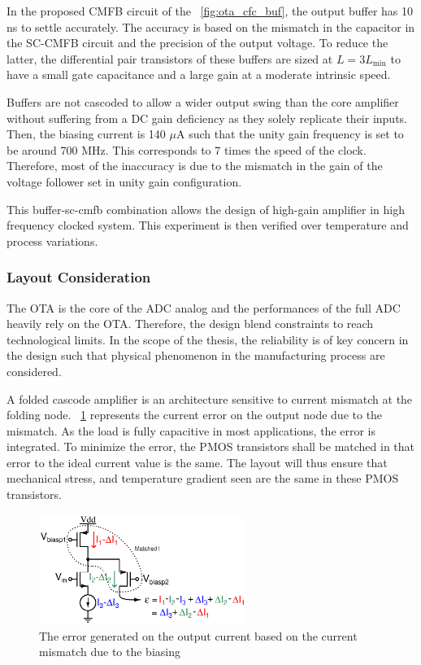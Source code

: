 In the proposed CMFB circuit of the \figurename~\ref{fig:ota_cfc_buf}, the output buffer has 10 ns to settle accurately. The accuracy is based on the mismatch in the capacitor in the SC-CMFB circuit and the precision of the output voltage. To reduce the latter, the differential pair transistors of these buffers are sized at \(L = 3 L_{\min} \) to have a small gate capacitance and a large gain at a moderate intrinsic speed.

Buffers are not cascoded to allow a wider output swing than the core amplifier without suffering from a DC gain deficiency as they solely replicate their inputs. Then, the biasing current is 140 \(\mu \)A such that the unity gain frequency is set to be around 700 MHz. This corresponds to 7 times the speed of the clock. Therefore, most of the inaccuracy is due to the mismatch in the gain of the voltage follower set in unity gain configuration.

This buffer-sc-cmfb combination allows the design of high-gain amplifier in high frequency clocked system. This experiment is then verified over temperature and process variations.

\subsubsection{Layout Consideration}
The OTA is the core of the ADC analog and the performances of the full ADC heavily rely on the OTA\@. Therefore, the design blend constraints to reach technological limits. In the scope of the thesis, the reliability is of key concern in the design such that physical phenomenon in the manufacturing process are considered.

A folded cascode amplifier is an architecture sensitive to current mismatch at the folding node. \figurename~\ref{fig:folded-node-mismatch} represents the current error on the output node due to the mismatch. As the load is fully capacitive in most applications, the error is integrated. To minimize the error, the PMOS transistors shall be matched in that error to the ideal current value is the same. The layout will thus ensure that mechanical stress, and temperature gradient seen are the same in these PMOS transistors.

\begin{figure}[htp]
    \centering
    \includegraphics[width=0.6\textwidth]{Chapter7/Figs/folded-mismatch-gradient.ps}
    \caption{The error generated on the output current based on the current mismatch due to the biasing}
    \label{fig:folded-node-mismatch}
\end{figure}

